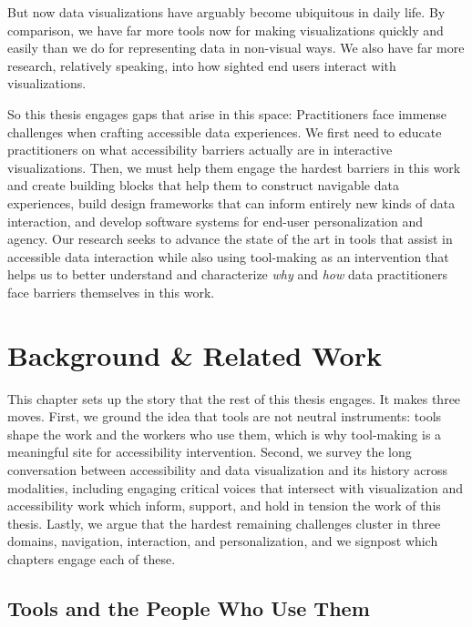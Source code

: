 \documentclass[12pt]{cmuthesis}
\begin{document}
But now data visualizations have arguably become ubiquitous in daily life. By comparison, we have far more tools now for making visualizations quickly and easily than we do for representing data in non-visual ways. We also have far more research, relatively speaking, into how sighted end users interact with visualizations.

So this thesis engages gaps that arise in this space: Practitioners face immense challenges when crafting accessible data experiences. We first need to educate practitioners on what accessibility barriers actually are in interactive visualizations. Then, we must help them engage the hardest barriers in this work and create building blocks that help them to construct navigable data experiences, build design frameworks that can inform entirely new kinds of data interaction, and develop software systems for end-user personalization and agency. Our research seeks to advance the state of the art in tools that assist in accessible data interaction while also using tool-making as an intervention that helps us to better understand and characterize \textit{why} and \textit{how} data practitioners face barriers themselves in this work.


\chapter{Background \& Related Work}

This chapter sets up the story that the rest of this thesis engages. It makes three moves. First, we ground the idea that tools are not neutral instruments: tools shape the work and the workers who use them, which is why tool-making is a meaningful site for accessibility intervention. Second, we survey the long conversation between accessibility and data visualization and its history across modalities, including engaging critical voices that intersect with visualization and accessibility work which inform, support, and hold in tension the work of this thesis. Lastly, we argue that the hardest remaining challenges cluster in three domains, navigation, interaction, and personalization, and we signpost which chapters engage each of these.
 
\section{Tools and the People Who Use Them}
 
\end{document}
